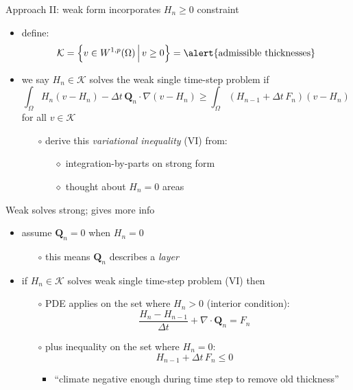 \documentclass{beamer}
\newcommand\bQ{\mathbf{Q}}
\newcommand{\Div}{\nabla\cdot}
\newcommand{\grad}{\nabla}
\begin{document}
\begin{frame}{Approach II: weak form incorporates $H_n\ge 0$ constraint}

  \begin{itemize}
  \item define:
    $$\mathcal{K} = \left\{v \in W^{1,p}(\Omega) \,\Big|\, v\ge 0\right\} = \text{\alert{admissible thicknesses}}$$
  \item we say $H_n \in \mathcal{K}$ solves the \alert{weak single time-step problem} if
    $$\int_\Omega H_n (v - H_n) - \Delta t\, \bQ_n \cdot \grad(v - H_n) \ge \int_\Omega \left(H_{n-1} + \Delta t\, F_n\right) (v - H_n)$$
  for all $v \in \mathcal{K}$
  \small
  \medskip
    \begin{itemize}
    \item[$\circ$] derive this \emph{variational inequality} (VI) from:
      \begin{itemize}
      \item[$\diamond$] integration-by-parts on strong form
      \item[$\diamond$] thought about $H_n=0$ areas
      \end{itemize}
    \end{itemize}
  \end{itemize}
\end{frame}


\begin{frame}{Weak solves strong; gives more info}

\begin{itemize}
  \item assume $\bQ_n=0$ when $H_n=0$
    \begin{itemize}
    \item[$\circ$] this means $\bQ_n$ describes a \emph{layer}
    \end{itemize}
  \item if $H_n \in \mathcal{K}$ solves weak single time-step problem (VI) then
  
      \medskip
	  \begin{itemize}
	  \item[$\circ$] PDE applies on the set where $H_n>0$ (interior condition):
	    $$\frac{H_n - H_{n-1}}{\Delta t} + \Div \bQ_n = F_n$$
	  \item[$\circ$] plus inequality on the set where $H_n = 0$:
	    $$H_{n-1} + \Delta t\, F_n \le 0$$
	    \vspace{-6mm}
	    \begin{itemize}
	    \item ``climate negative enough during time step to remove old thickness''
	    \end{itemize}
	  \end{itemize}
\end{itemize}
\end{frame}
\end{document}
